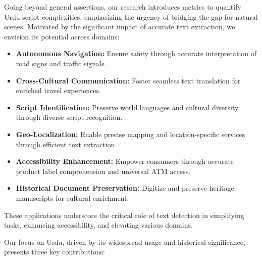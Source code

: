 \documentclass[default,iicol]{sn-jnl} %
\begin{document}
Going beyond general assertions, our research introduces metrics to quantify Urdu script complexities, emphasizing the urgency of bridging the gap for natural scenes. Motivated by the significant impact of accurate text extraction, we envision its potential across domains:

\begin{itemize}
	\item \textbf{Autonomous Navigation:} Ensure safety through accurate interpretation of road signs and traffic signals.
	\item \textbf{Cross-Cultural Communication:} Foster seamless text translation for enriched travel experiences.
	\item \textbf{Script Identification:} Preserve world languages and cultural diversity through diverse script recognition.
	\item \textbf{Geo-Localization:} Enable precise mapping and location-specific services through efficient text extraction.
	\item \textbf{Accessibility Enhancement:} Empower consumers through accurate product label comprehension and universal ATM access.
	\item \textbf{Historical Document Preservation:} Digitize and preserve heritage manuscripts for cultural enrichment.
\end{itemize}

These applications underscore the critical role of text detection in simplifying tasks, enhancing accessibility, and elevating various domains.

Our focus on Urdu, driven by its widespread usage and historical significance, presents three key contributions:
\end{document}
